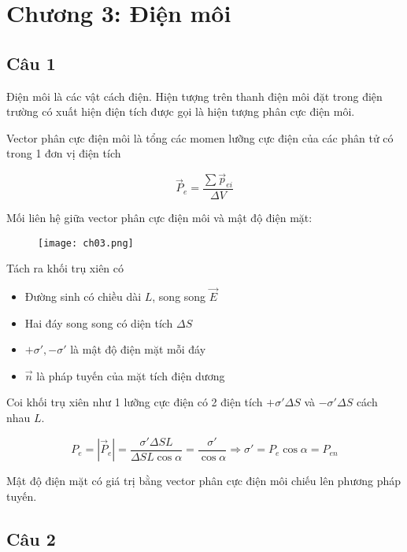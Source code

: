\section[Chương 3]{Chương 3: Điện môi}

\subsection{Câu 1}

Điện môi là các vật cách điện. Hiện tượng trên thanh điện môi đặt trong điện trường có xuất hiện điện tích được gọi là hiện tượng phân cực điện môi.

Vector phân cực điện môi là tổng các momen lưỡng cực điện của các phân tử có trong 1 đơn vị điện tích

\begin{equation*}
  \vec{P}_e = \frac{\sum \vec{p}_{ei}}{\Delta V}
\end{equation*}

Mối liên hệ giữa vector phân cực điện môi và mật độ điện mặt:

\begin{figure}[h]
  \centering
  \texttt{[image: ch03.png]}
\end{figure}

Tách ra khối trụ xiên có

\begin{itemize}
  \item Đường sinh có chiều dài $L$, song song $\vec{E}$
  \item Hai đáy song song có diện tích $\Delta S$
  \item $+\sigma', -\sigma'$ là mật độ điện mặt mỗi đáy
  \item $\vec{n}$ là pháp tuyến của mặt tích điện dương
\end{itemize}

Coi khối trụ xiên như 1 lưỡng cực điện có 2 điện tích $+\sigma' \Delta S$ và $-\sigma' \Delta S$ cách nhau $L$.

\begin{equation*}
  P_e = \left| \vec{P}_e \right| = \frac{\sigma' \Delta S L}{\Delta S L \cos\alpha} = \frac{\sigma'}{\cos\alpha} 
  \Rightarrow \sigma' = P_e\cos\alpha = P_{en}
\end{equation*}

Mật độ điện mặt có giá trị bằng vector phân cực điện môi chiếu lên phương pháp tuyến.

\subsection{Câu 2}

